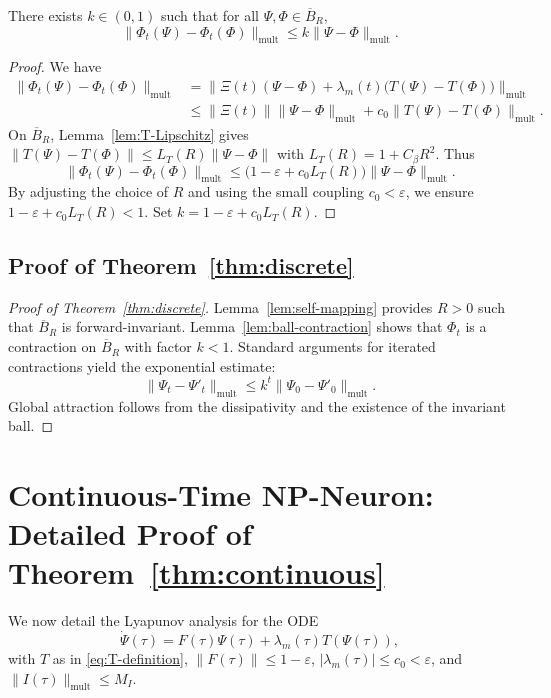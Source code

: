 \documentclass[11pt]{article}
\begin{document}
\begin{lemma}
\label{lem:ball-contraction}
There exists \(k\in(0,1)\) such that for all \(\Psi,\Phi\in\overline{B}_R\),
\[
\|\Phi_t(\Psi) - \Phi_t(\Phi)\|_{\mathrm{mult}}
\le k \|\Psi - \Phi\|_{\mathrm{mult}}.
\]
\end{lemma}

\begin{proof}
We have
\[
\begin{aligned}
\|\Phi_t(\Psi) - \Phi_t(\Phi)\|_{\mathrm{mult}}
&= \|\Xi(t)(\Psi - \Phi) + \lambda_m(t)\bigl(T(\Psi) - T(\Phi)\bigr)\|_{\mathrm{mult}} \\
&\le \|\Xi(t)\|\|\Psi - \Phi\|_{\mathrm{mult}}
+ c_0 \|T(\Psi) - T(\Phi)\|_{\mathrm{mult}}.
\end{aligned}
\]
On \(\overline{B}_R\), Lemma~\ref{lem:T-Lipschitz} gives \(\|T(\Psi) - T(\Phi)\|\le L_T(R)\|\Psi - \Phi\|\) with \(L_T(R) = 1+C_\beta R^2\).
Thus
\[
\|\Phi_t(\Psi) - \Phi_t(\Phi)\|_{\mathrm{mult}}
\le \bigl(1-\varepsilon + c_0 L_T(R)\bigr)\|\Psi - \Phi\|_{\mathrm{mult}}.
\]
By adjusting the choice of \(R\) and using the small coupling \(c_0<\varepsilon\), we ensure \(1-\varepsilon + c_0 L_T(R) < 1\). Set \(k = 1-\varepsilon + c_0 L_T(R)\).
\end{proof}

\subsection{Proof of Theorem~\ref{thm:discrete}}

\begin{proof}[Proof of Theorem~\ref{thm:discrete}]
Lemma~\ref{lem:self-mapping} provides \(R>0\) such that \(\overline{B}_R\) is forward-invariant.
Lemma~\ref{lem:ball-contraction} shows that \(\Phi_t\) is a contraction on \(\overline{B}_R\) with factor \(k<1\).
Standard arguments for iterated contractions yield the exponential estimate:
\[
\|\Psi_t - \Psi'_t\|_{\mathrm{mult}}
\le k^t \|\Psi_0 - \Psi'_0\|_{\mathrm{mult}}.
\]
Global attraction follows from the dissipativity and the existence of the invariant ball.
\end{proof}

\section{Continuous-Time NP-Neuron: Detailed Proof of Theorem~\ref{thm:continuous}}

We now detail the Lyapunov analysis for the ODE
\[
\dot{\Psi}(\tau) = F(\tau)\Psi(\tau) + \lambda_m(\tau) T(\Psi(\tau)),
\]
with \(T\) as in \eqref{eq:T-definition}, \(\|F(\tau)\|\le 1-\varepsilon\), \(|\lambda_m(\tau)|\le c_0<\varepsilon\), and \(\|I(\tau)\|_{\mathrm{mult}}\le M_I\).
\end{document}
